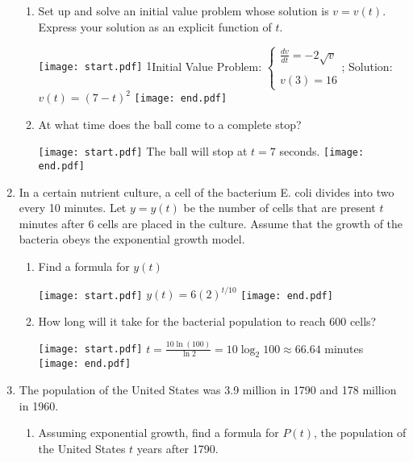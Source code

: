 \documentclass[12pt]{article}
\begin{document}
\begin{enumerate}
\begin{enumerate}
\item Set up and solve an initial value problem whose solution is $v=v(t)$.  Express your solution as an explicit function of $t$.

\texttt{[image: start.pdf]}
{{{1\linewidth}{Initial Value Problem:
$\left\{\begin{array}{l}
\frac{dv}{dt}=-2\sqrt{v}\\
\\
v(3)=16
\end{array}\right.$; Solution:
$v(t)=(7-t)^2$}}}
\texttt{[image: end.pdf]}


\item At what time does the ball come to a complete stop?

\texttt{[image: start.pdf]}
{{The ball will stop at $t=7$ seconds.}}
\texttt{[image: end.pdf]}


\end{enumerate}

\item In a certain nutrient culture, a cell of the bacterium E. coli divides into two every 10 minutes.  Let $y=y(t)$ be the number of cells that are present $t$ minutes after 6 cells are placed in the culture.  Assume that the growth of the bacteria obeys the exponential growth model.

\begin{enumerate}

\item Find a formula for $y(t)$

\texttt{[image: start.pdf]}
{{$y(t)=6(2)^{t/10}$}}
\texttt{[image: end.pdf]}


\item How long will it take for the bacterial population to reach 600 cells?

\texttt{[image: start.pdf]}
{{$t=\frac{10\ln{(100)}}{\ln{2}}=10\log_2 100 \approx 66.64$ minutes}}
\texttt{[image: end.pdf]}


\end{enumerate}

\item The population of the United States was 3.9 million in 1790 and 178 million in 1960.  

\begin{enumerate}

\item Assuming exponential growth, find a formula for $P(t)$, the population of the United States $t$ years after 1790.


\end{enumerate}
\end{enumerate}
\end{document}
